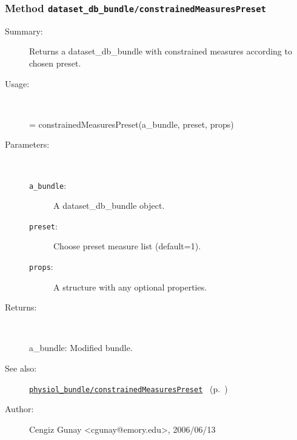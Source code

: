 \subsubsection[Method \texttt{constrainedMeasuresPreset}]{Method \texttt{dataset\_db\_bundle/constrainedMeasuresPreset}}%
%
\label{ref_dataset_db_bundle__constrainedMeasuresPreset}%
\hypertarget{ref_dataset_db_bundle__constrainedMeasuresPreset}{}%
\begin{description}
\item[Summary:]Returns a dataset\_db\_bundle with constrained measures according to chosen preset.
%
\item[Usage:]~%
\begin{lyxcode}%
[a\_bundle test\_names] = constrainedMeasuresPreset(a\_bundle, preset, props)
%
\end{lyxcode}%
%
%
\item[Parameters:]~
\begin{description}%
\item[\texttt{a\_bundle}:]
 A dataset\_db\_bundle object.
\item[\texttt{preset}:]
 Choose preset measure list (default=1).
\item[\texttt{props}:]
 A structure with any optional properties.
\end{description}%
%
\item[Returns:
]~

	a\_bundle: Modified bundle.
%
%
\item[See also:]%
\hyperlink{ref_physiol_bundle__constrainedMeasuresPreset}{\texttt{physiol\_bundle/constrainedMeasuresPreset}}%
\ (p.~\pageref{ref_physiol_bundle__constrainedMeasuresPreset})%
%
%
\item[Author:]%
Cengiz Gunay <cgunay@emory.edu>, 2006/06/13
%
\end{description}
\methodline%
